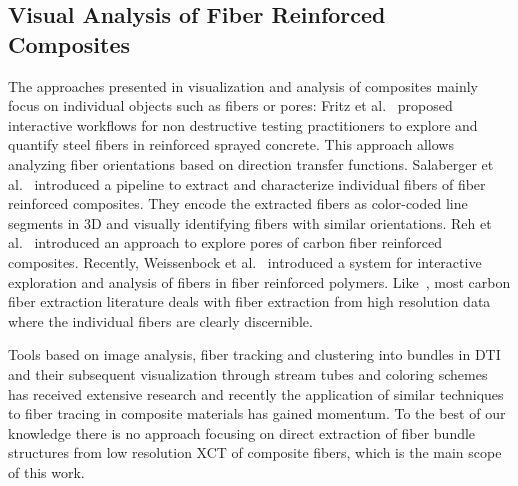 \subsection {Visual Analysis of Fiber Reinforced Composites}
The approaches presented in visualization and analysis of composites mainly focus on individual objects such as fibers or pores: Fritz et al.~\cite{Fritz2009} proposed interactive workflows for non destructive testing practitioners to explore and quantify steel fibers in reinforced sprayed concrete. This approach allows analyzing fiber orientations based on direction transfer functions. Salaberger et al.~\cite{Salaberger2011} introduced a pipeline to extract and characterize individual fibers of fiber reinforced composites. They encode the extracted fibers as color-coded line segments in 3D and visually identifying fibers with similar orientations. Reh et al.~\cite{PMI_AR_2012} introduced an approach to explore pores of carbon fiber reinforced composites. Recently, Weissenbock et al.~\cite{Weissenbock2014} introduced a system for interactive exploration and analysis of fibers in fiber reinforced polymers. 
Like~\cite{Weissenbock2014}, most carbon fiber extraction literature deals with fiber extraction from high resolution data where the individual fibers are clearly discernible.

Tools based on image analysis, fiber tracking and clustering into bundles in DTI and their subsequent visualization through stream tubes and coloring schemes has received extensive research and recently the application of similar techniques to fiber tracing in composite materials has gained momentum. To the best of our knowledge there is no approach focusing on direct extraction of fiber bundle structures from low resolution XCT of composite fibers, which is the main scope of this work.


